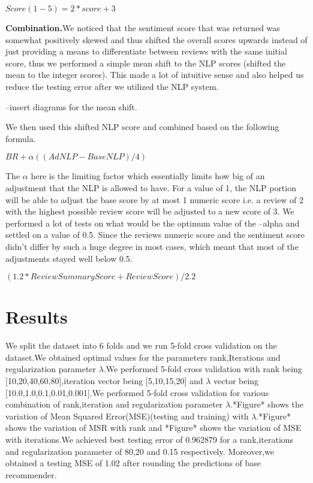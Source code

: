 \documentclass{article} %
\begin{document}
$Score (1-5 ) = 2*score + 3$


\textbf{Combination.}We noticed that the sentiment score that was returned was somewhat positively skewed and thus shifted the overall scores upwards instead of just providing a means to differentiate between reviews with the same initial score, thus we performed a simple mean shift to the NLP scores (shifted the mean to the integer scores). This made a lot of intuitive sense and also helped us reduce the testing error after we utilized the NLP system. 

--insert diagrams for the mean shift. 

We then used this shifted NLP score and combined based on the following formula. 

$BR + \alpha((AdNLP - BaseNLP)/4) $

The $\alpha$ here is the limiting factor which essentially limits how big of an adjustment that the NLP is allowed to have. For a value of 1, the NLP portion will be able to adjust the base score by at most 1 numeric score i.e. a review of 2 with the highest possible review score will be adjusted to a new score of 3. We performed a lot of tests on what would be the optimum value of the --alpha and settled on a value of 0.5. Since the reviews numeric score and the sentiment score didn't differ by such a huge degree in most cases, which meant that most of the adjustments stayed well below 0.5.  

$(1.2 * Review Summary Score  + Review Score ) /2.2 $

\section{Results}
We split the dataset into 6 folds and we run 5-fold cross validation on the dataset.We obtained optimal values for the parameters rank,Iterations and regularization parameter $\lambda$.We performed 5-fold cross validation with rank being [10,20,40,60,80],iteration vector being [5,10,15,20] and $\lambda$ vector being [10.0,1.0,0.1,0.01,0.001].We performed 5-fold cross validation for various combination of rank,iteration and regularization parameter  $\lambda$.*Figure*  shows the variation of Mean Squared Error(MSE)(testing and training) with $\lambda$.*Figure* shows the variation of MSR with rank and *Figure* shows the variation of MSE with iterations.We achieved best testing error of 0.962879 for a rank,iterations and regularization parameter of  80,20 and 0.15 respectively.
Moreover,we obtained a testing MSE of 1.02 after rounding the predictions of base recommender.
\end{document}
